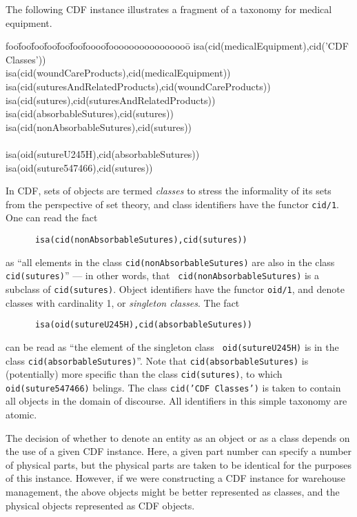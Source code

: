\begin{example} \rm \label{ex:suture1}
The following CDF instance illustrates a fragment of a taxonomy for
medical equipment.
{\tt  {\small 
\begin{tabbing}
foo\=foo\=foo\=foo\=foo\=foo\=foooo\=foooooooooooooooo\=\kill
isa(cid(medicalEquipment),cid('CDF Classes'))  \\
\> isa(cid(woundCareProducts),cid(medicalEquipment)) \\
\> \> \>  isa(cid(suturesAndRelatedProducts),cid(woundCareProducts)) \\
\> \> \> isa(cid(sutures),cid(suturesAndRelatedProducts))  \\
\> \> \> \> isa(cid(absorbableSutures),cid(sutures))  \\
\> \> \> \> isa(cid(nonAbsorbableSutures),cid(sutures)) \\
\> \\
\> \> \>   isa(oid(sutureU245H),cid(absorbableSutures))  \\
\> \> \> \> \>   isa(oid(suture547466),cid(sutures)) 
\end{tabbing} }} 
\noindent
In CDF, sets of objects are termed {\em classes} to stress the
informality of its sets from the perspective of set theory, and class
identifiers have the functor {\tt cid/1}.  One can read the fact
\begin{verbatim}
      isa(cid(nonAbsorbableSutures),cid(sutures))
\end{verbatim}
as ``all elements in the class {\tt cid(nonAbsorbableSutures)} are
also in the class {\tt cid(sutures)}'' --- in other words, that {\tt
cid(nonAbsorbableSutures)} is a subclass of {\tt cid(sutures)}.
Object identifiers have the functor {\tt oid/1}, and denote classes
with cardinality 1, or {\em singleton classes}.  The fact
\begin{verbatim}
      isa(oid(sutureU245H),cid(absorbableSutures))
\end{verbatim}
can be read as ``the element of the singleton class {\tt
oid(sutureU245H)} is in the class {\tt cid(absorbableSutures)}''.
Note that {\tt cid(absorbableSutures)} is (potentially) more specific
than the class {\tt cid(sutures)}, to which {\tt oid(suture547466)}
belings.  The class {\tt cid('CDF Classes')} is taken to contain all
objects in the domain of discourse.  All identifiers in this simple
taxonomy are atomic.

The decision of whether to denote an entity as an object or as a class
depends on the use of a given CDF instance.  Here, a given part number
can specify a number of physical parts, but the physical parts are
taken to be identical for the purposes of this instance.  However, if
we were constructing a CDF instance for warehouse management, the
above objects might be better represented as classes, and the physical
objects represented as CDF objects.
\end{example} 

